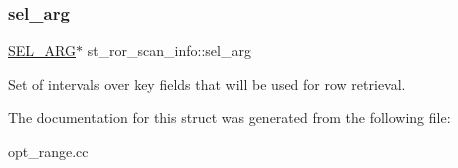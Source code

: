 \subsubsection{\texorpdfstring{sel\+\_\+arg}{sel\_arg}}
{\footnotesize\ttfamily \mbox{\hyperlink{classSEL__ARG}{S\+E\+L\+\_\+\+A\+RG}}$\ast$ st\+\_\+ror\+\_\+scan\+\_\+info\+::sel\+\_\+arg}

Set of intervals over key fields that will be used for row retrieval. 

The documentation for this struct was generated from the following file\+:\begin{DoxyCompactItemize}
\item 
opt\+\_\+range.\+cc\end{DoxyCompactItemize}
